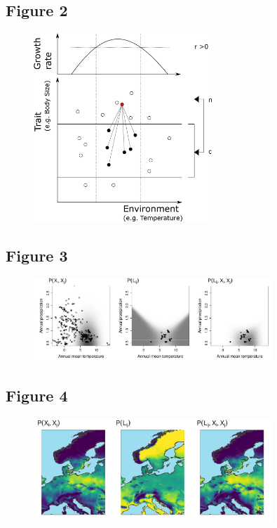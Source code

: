 \documentclass[12pt]{article}
\begin{document}
\newpage

\subsection*{Figure 2}

\begin{figure}[ht!]
\centering\includegraphics[width=0.6\textwidth]{figures/integrated_niche}
\end{figure}

\newpage

\subsection*{Figure 3}

\begin{figure}[ht!]
\centering\includegraphics[width=0.8\textwidth]{figures/example_pair}
\end{figure}

\newpage

\subsection*{Figure 4}

\begin{figure}[ht!]
\centering\includegraphics[width=0.8\textwidth]{figures/map_pair}
\end{figure}
\end{document}
